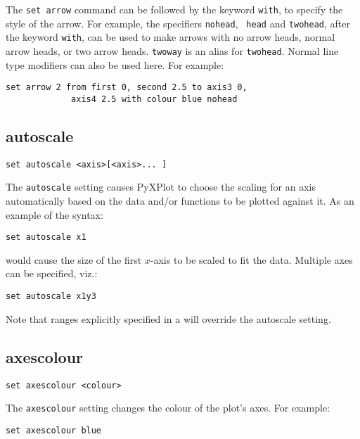 The {\tt set arrow} command can be followed by the keyword {\tt with}, to
specify the style of the arrow. For example, the specifiers {\tt nohead}, {\tt
head} and {\tt twohead}, after the keyword {\tt with}, can be used to make
arrows with no arrow heads, normal arrow heads, or two arrow heads. {\tt twoway}
is an alias for {\tt twohead}.  Normal line type modifiers can also be used
here.  For example:

\begin{verbatim}
set arrow 2 from first 0, second 2.5 to axis3 0,
             axis4 2.5 with colour blue nohead
\end{verbatim}



\subsection{autoscale}

\begin{verbatim}
set autoscale <axis>[<axis>... ] 
\end{verbatim}

The {\tt autoscale} setting causes PyXPlot to choose the scaling for an axis
automatically based on the data and/or functions to be plotted against it. As
an example of the syntax:

\begin{verbatim}
set autoscale x1
\end{verbatim}

\noindent would cause the size of the first $x$-axis to be scaled to fit the
data.  Multiple axes can be specified, viz.:

\begin{verbatim}
set autoscale x1y3
\end{verbatim}

Note that ranges explicitly specified in a  will override
the autoscale setting.


\subsection{axescolour}

\begin{verbatim}
set axescolour <colour>
\end{verbatim}

The {\tt axescolour} setting changes the colour of the plot's axes.  For example:

\begin{verbatim}
set axescolour blue
\end{verbatim}

